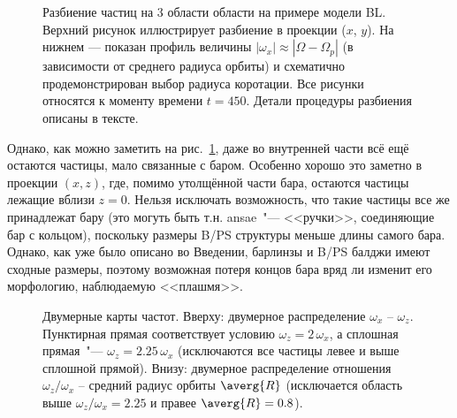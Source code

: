 \documentclass[tikz]{trlnotes}
\begin{document}
\begin{figure}[htpb]
  \centering
  \caption{Разбиение частиц на 3 области области на примере модели BL.
    Верхний рисунок иллюстрирует разбиение в проекции ($x$, $y$).
    На нижнем --- показан профиль величины $|ω_x| \approx |Ω - Ω_p|$ (в зависимости от среднего радиуса орбиты) и схематично продемонстрирован выбор радиуса коротации. Все рисунки относятся к моменту времени $t=450$.
Детали процедуры разбиения описаны в тексте.}%
  \label{fig:disksplit}
\end{figure}

Однако, как можно заметить на рис.~\ref{fig:disksplit}, даже во внутренней части всё ещё остаются частицы, мало
связанные с баром. Особенно хорошо это заметно в проекции $(x, z)$, где, помимо утолщённой части бара, остаются
частицы лежащие вблизи $z=0$. Нельзя исключать возможность, что такие частицы все же принадлежат бару (это могуть быть т.н.
ansae~"--- <<ручки>>, соединяющие бар с кольцом), поскольку размеры B/PS структуры меньше длины самого бара. Однако, как
уже было описано во Введении, барлинзы и B/PS балджи имеют сходные размеры, поэтому возможная потеря концов бара
вряд ли изменит его морфологию, наблюдаемую <<плашмя>>. 

\begin{figure}[htpb]
  \centering
  \caption{Двумерные карты частот. Вверху: двумерное распределение
    $ω_x$ -- $ω_z$. Пунктирная прямая соответствует условию $ω_z = 2\,ω_x$, а сплошная прямая~"--- $ω_z = 2.25\, ω_x$
    (исключаются все частицы левее и выше сплошной прямой). Внизу: двумерное распределение отношения $ω_z/ω_x$ -- средний радиус орбиты $\averg{R}$ 
  (исключается область выше $ω_z/ω_x = 2.25$ и правее $\averg{R} = 0.8$).}
  \label{fig:innerrefine}
\end{figure}
\end{document}
